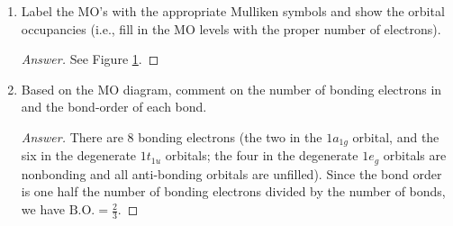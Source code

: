 \documentclass[../psets.tex]{subfiles}
\begin{document}
\begin{enumerate}[label={\Roman*)}]
\begin{enumerate}[label={\alph*)}]
\begin{proof}[Answer]
\begin{figure}[h!]
                \caption{ orbital diagram.}
                \label{fig:orbitalDiagram-SF6}
            \end{figure}
        \end{proof}
        \item Label the MO's with the appropriate Mulliken symbols and show the orbital occupancies (i.e., fill in the MO levels with the proper number of electrons).
        \begin{proof}[Answer]
            See Figure \ref{fig:orbitalDiagram-SF6}.
        \end{proof}
        \item Based on the MO diagram, comment on the number of bonding electrons in  and the bond-order of each  bond.
        \begin{proof}[Answer]
            There are 8 bonding electrons (the two in the $1a_{1g}$ orbital, and the six in the degenerate $1t_{1u}$ orbitals; the four in the degenerate $1e_g$ orbitals are nonbonding and all anti-bonding orbitals are unfilled). Since the bond order is one half the number of bonding electrons divided by the number of bonds, we have $\text{B.O.}=\frac{2}{3}$.
        \end{proof}
    \end{enumerate}
\end{enumerate}


\end{document}
